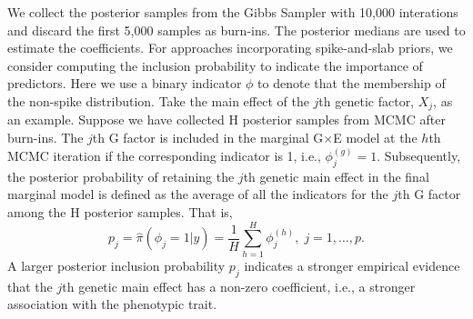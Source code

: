 \documentclass[12pt]{article}
\begin{document}
%

We collect the posterior samples from the Gibbs Sampler with 10,000 interations and discard the first 5,000 samples as burn-ins. The posterior medians are used to estimate the coefficients. For approaches incorporating spike-and-slab priors, we consider computing the inclusion probability to indicate the importance of predictors. Here we use a binary indicator $\phi$ to denote that the membership of the non-spike distribution. Take the main effect of the $j$th genetic factor, $X_{j}$, as an example. Suppose we have collected H posterior samples from MCMC after burn-ins. The $j$th G factor is included in the marginal G$\times$E model at the $h$th MCMC iteration if the corresponding indicator is 1, i.e., $\phi_j^{(g)} = 1$. Subsequently, the posterior probability of retaining the $j$th genetic main effect in the final marginal model is defined as the average of all the indicators for the $j$th G factor among the H posterior samples. That is,
\begin{equation*}
p_j = \hat{\pi} (\phi_j = 1|y) = \frac{1}{H} \sum_{h=1}^{H} \phi_j^{(h)}, \;  j = 1, \dots,p.
\end{equation*}
A larger posterior inclusion probability $p_j$ indicates a stronger empirical evidence that the $j$th genetic main effect has a non-zero coefficient, i.e., a stronger association with the phenotypic trait. 

\end{document}
